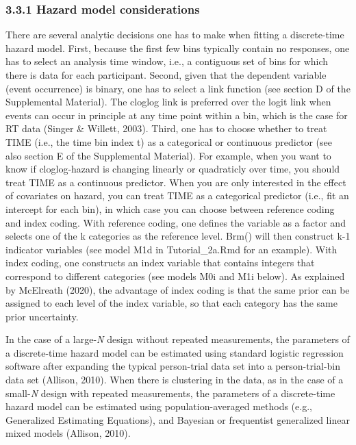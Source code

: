 \documentclass[
  man, donotrepeattitle,floatsintext]{apa6}
\begin{document}
\subsubsection{3.3.1 Hazard model considerations}\label{hazard-model-considerations}

There are several analytic decisions one has to make when fitting a discrete-time hazard model. First, because the first few bins typically contain no responses, one has to select an analysis time window, i.e., a contiguous set of bins for which there is data for each participant. Second, given that the dependent variable (event occurrence) is binary, one has to select a link function (see section D of the Supplemental Material). The cloglog link is preferred over the logit link when events can occur in principle at any time point within a bin, which is the case for RT data (Singer \& Willett, 2003). Third, one has to choose whether to treat TIME (i.e., the time bin index t) as a categorical or continuous predictor (see also section E of the Supplemental Material). For example, when you want to know if cloglog-hazard is changing linearly or quadraticly over time, you should treat TIME as a continuous predictor.
When you are only interested in the effect of covariates on hazard, you can treat TIME as a categorical predictor (i.e., fit an intercept for each bin), in which case you can choose between reference coding and index coding. With reference coding, one defines the variable as a factor and selects one of the k categories as the reference level. Brm() will then construct k-1 indicator variables (see model M1d in Tutorial\_2a.Rmd for an example). With index coding, one constructs an index variable that contains integers that correspond to different categories (see models M0i and M1i below). As explained by McElreath (2020), the advantage of index coding is that the same prior can be assigned to each level of the index variable, so that each category has the same prior uncertainty.

In the case of a large-\emph{N} design without repeated measurements, the parameters of a discrete-time hazard model can be estimated using standard logistic regression software after expanding the typical person-trial data set into a person-trial-bin data set (Allison, 2010). When there is clustering in the data, as in the case of a small-\emph{N} design with repeated measurements, the parameters of a discrete-time hazard model can be estimated using population-averaged methods (e.g., Generalized Estimating Equations), and Bayesian or frequentist generalized linear mixed models (Allison, 2010).
\end{document}
